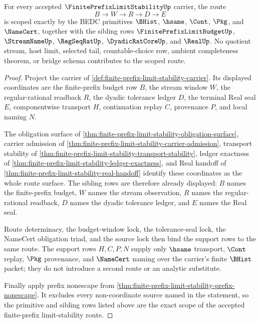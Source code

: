 \begin{theorem}
\label{thm:finite-prefix-limit-stability-primitive-scope-binding}
For every accepted $\FinitePrefixLimitStabilityUp$ carrier, the route
$$
B \to W \to R \to D \to E
$$
is scoped exactly by the BEDC primitives $\BHist$, $\hsame$, $\Cont$, $\Pkg$, and $\NameCert$, together with the sibling rows $\FinitePrefixLimitBudgetUp$, $\StreamNameUp$, $\RegSeqRatUp$, $\DyadicRatCoreUp$, and $\RealUp$. No quotient stream, host limit, selected tail, countable-choice row, ambient completeness theorem, or bridge schema contributes to the scoped route.
\end{theorem}
\begin{proof}
Project the carrier of \autoref{def:finite-prefix-limit-stability-carrier}. Its displayed coordinates are the finite-prefix budget row $B$, the stream window $W$, the regular-rational readback $R$, the dyadic tolerance ledger $D$, the terminal Real seal $E$, componentwise transport $H$, continuation replay $C$, provenance $P$, and local naming $N$.

The obligation surface of \autoref{thm:finite-prefix-limit-stability-obligation-surface}, carrier admission of \autoref{thm:finite-prefix-limit-stability-carrier-admission}, transport stability of \autoref{thm:finite-prefix-limit-stability-transport-stability}, ledger exactness of \autoref{thm:finite-prefix-limit-stability-ledger-exactness}, and Real handoff of \autoref{thm:finite-prefix-limit-stability-real-handoff} identify these coordinates as the whole route surface. The sibling rows are therefore already displayed: $B$ names the finite-prefix budget, $W$ names the stream observation, $R$ names the regular-rational readback, $D$ names the dyadic tolerance ledger, and $E$ names the Real seal.

Route determinacy, the budget-window lock, the tolerance-seal lock, the NameCert obligation triad, and the source lock then bind the support rows to the same route. The support rows $H,C,P,N$ supply only $\hsame$ transport, $\Cont$ replay, $\Pkg$ provenance, and $\NameCert$ naming over the carrier's finite $\BHist$ packet; they do not introduce a second route or an analytic substitute.

Finally apply prefix nonescape from \autoref{thm:finite-prefix-limit-stability-prefix-nonescape}. It excludes every non-coordinate source named in the statement, so the primitive and sibling rows listed above are the exact scope of the accepted finite-prefix limit-stability route.
\end{proof}


